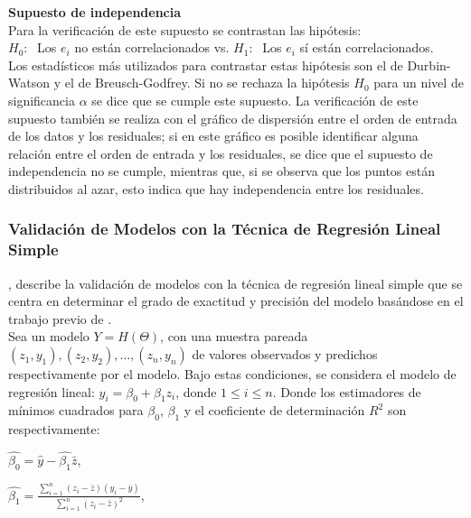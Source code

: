 \textbf{Supuesto de independencia}\\

Para la verificación de este supuesto se contrastan las hipótesis:\\

$H_0:\;$ Los $e_i$ no están correlacionados vs. $H_1:\;$ Los $e_i$ sí están correlacionados.\\

Los estadísticos más utilizados para contrastar estas hipótesis son el de Durbin-Watson y el de Breusch-Godfrey. Si no se rechaza la hipótesis $H_0$ para un nivel de significancia $\alpha$ se dice que se cumple este supuesto. La verificación de este supuesto también se realiza con el gráfico de dispersión entre el orden de entrada de los datos y los residuales; si en este gráfico es posible identificar alguna relación entre el orden de entrada y los residuales, se dice que el supuesto de independencia no se cumple, mientras que, si se observa que los puntos están distribuidos al azar, esto indica que hay independencia entre los residuales.


\subsubsection{Validación de Modelos con la Técnica de Regresión Lineal Simple \parencite{febles-2014}}

\textcite{febles-2014}, describe la validación de modelos con la técnica de regresión lineal simple que se centra en determinar el grado de exactitud y precisión del modelo basándose en el trabajo previo de \textcite{balam-2012}.\\

Sea un modelo $Y = H(\Theta )$, con una muestra pareada $(z_{1}, y_{1}), (z_{2}, y_{2}) , \dots , (z_{n}, y_{n})$ de valores observados y predichos respectivamente por el modelo. Bajo estas condiciones, se considera el modelo de regresión lineal: $y_{i}= \beta_{0} + \beta_{1}z_{i}$, donde $ 1 \leq i \leq n$. Donde  los estimadores de mínimos cuadrados para $\beta_{0}$,  $\beta_{1}$ y el coeficiente de determinación $R^{2}$ son respectivamente: \\

\begin{center}
	$\hat{\beta_{0}} = \hat{y} - \hat{\beta_{1}} \bar{z} $, \\
\end{center}

\begin{center}
	$ \hat{\beta_{1}} = \frac{\sum_{i=1}^{n} (z_{i} - \bar{z} ) (y_{i} - \bar{y})} {  \sum_{i=1}^{n} (z_{i} - \bar{z} )^{2} }$, \\
\end{center}

